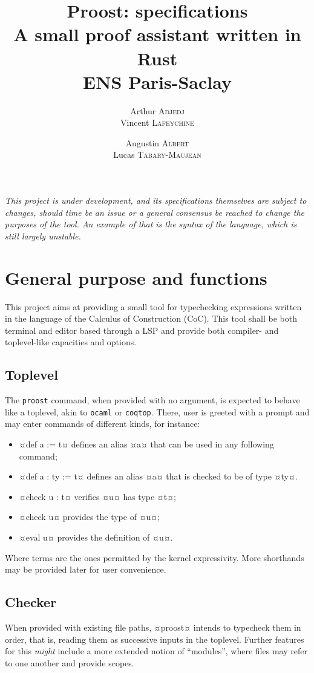 \documentclass[twocolumn]{article}
\author{
  Arthur \textsc{Adjedj}\\
  Vincent \textsc{Lafeychine} \and
  Augustin \textsc{Albert} \\
  Lucas \textsc{Tabary-Maujean}
}
\title{\textbf{Proost: specifications}\\
  \large A small proof assistant written in Rust
  \\[1\baselineskip]\normalsize ENS Paris-Saclay
}
\begin{document}
\thispagestyle{fancy}
\maketitle

\emph{
  This project is under development, and its specifications themselves are
  subject to changes, should time be an issue or a general consensus be reached
  to change the purposes of the tool. An example of that is the syntax of
  the language, which is still largely unstable.
}

\section{General purpose and functions}
This project aims at providing a small tool for typechecking expressions written in
the language of the Calculus of Construction (CoC). This tool shall be
both terminal and editor based through a LSP and provide both compiler- and toplevel-like capacities and
options.


\subsection{Toplevel}
The \texttt{proost} command, when provided with no argument, is expected to behave like
a toplevel, akin to \texttt{ocaml} or \texttt{coqtop}. There, user is greeted with a
prompt and may enter commands of different kinds, for instance:
\begin{itemize}
  \item ¤def a := t¤ defines an alias ¤a¤ that can be used in any following command;
  \item ¤def a : ty := t¤ defines an alias ¤a¤ that is checked to be of type ¤ty¤.
  \item ¤check u : t¤ verifies ¤u¤ has type ¤t¤;
  \item ¤check u¤ provides the type of ¤u¤;
  \item ¤eval u¤ provides the definition of ¤u¤.
\end{itemize}

Where terms are the ones permitted by the kernel expressivity.
More shorthands may be provided later for user convenience.


\subsection{Checker}
When provided with existing file paths, ¤proost¤ intends to typecheck them in
order, that is, reading them as successive inputs in the toplevel. Further
features for this \emph{might} include a more extended notion of ``modules'', where files
may refer to one another and provide scopes.
\end{document}
